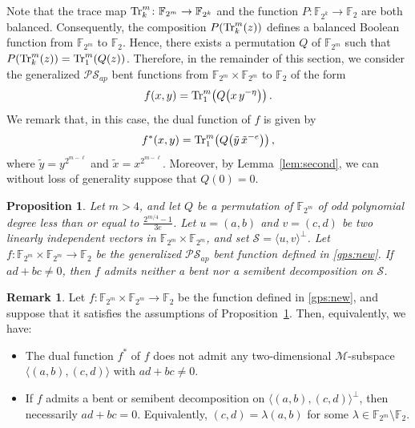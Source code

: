 \documentclass[12pt]{article}
\theoremstyle{plain}
\newtheorem{proposition}[lemma]{Proposition}
\theoremstyle{definition}
\newtheorem{remark}{Remark}
\renewcommand{\to}{\rightarrow}
\newcommand{\Tr}{{\rm Tr}}
\begin{document}
	Note that the trace map
	\(\Tr_k^{m} \colon \mathbb{F}_{2^{m}} \to \mathbb{F}_{2^{k}}\)
	and the function
	\(P \colon \mathbb{F}_{2^{k}} \to \mathbb{F}_2\)
	are both balanced. Consequently, the composition
	\(P\!\left(\Tr_k^{m}(z)\right)\)
	defines a balanced Boolean function from \(\mathbb{F}_{2^{m}}\) to \(\mathbb{F}_2\).
	Hence, there exists a permutation \(Q\) of \(\mathbb{F}_{2^{m}}\) such that $P\!\left(\Tr_k^{m}(z)\right)
	=
	\Tr_1^{m}\!\left(Q(z)\right)$.
	Therefore, in the remainder of this section, we consider the generalized
	\(\mathcal{PS}_{ap}\) bent functions from
	\(\mathbb{F}_{2^{m}} \times \mathbb{F}_{2^{m}}\) to \(\mathbb{F}_2\)
	of the form 
	\begin{align}\label{gps:new}
		f(x,y)
		=
		\Tr_1^{m}\!\left(Q\!\left(x\,y^{-\eta }\right)\right).
	\end{align}
	We remark that, in this case, the dual function of \(f\) is given by
	\begin{align}\label{gps:newdual}
		f^{\ast}(x,y)
		=
		\Tr_1^{m}\!\left(Q\!\left(\tilde y\, \tilde x^{-e}\right)\right),
	\end{align}
	where $\tilde y=y^{2^{m-\ell}}$ and $\tilde x=x^{2^{m-\ell}}$.
	Moreover, by Lemma~\ref{lem:second}, we can without loss of generality suppose that $Q(0)=0$.
	
	
	\begin{proposition}\label{mainprop}
		Let $m > 4$, and let $Q$ be a permutation of $\mathbb{F}_{2^{m}}$ of odd polynomial degree less than or equal to $\frac{2^{m/4}-1}{3e}$. 
		Let $u=(a,b)$ and $v=(c,d)$ be two linearly independent vectors in $\mathbb{F}_{2^{m}} \times \mathbb{F}_{2^{m}}$, and set $\mathcal{S} = \langle u, v \rangle^{\perp}$. 
		Let \(f \colon \mathbb{F}_{2^{m}} \times \mathbb{F}_{2^{m}} \to \mathbb{F}_2\) be the generalized
		\(\mathcal{PS}_{ap}\) bent function defined in \eqref{gps:new}.
		If $ad + bc \neq 0$, then $f$ admits neither a bent nor a semibent decomposition on $\mathcal{S}$.
	\end{proposition}
	
	
	\begin{remark} \label{rem:mainpro}
		Let
		$f\colon \mathbb{F}_{2^{m}} \times \mathbb{F}_{2^{m}} \to \mathbb{F}_2$
		be the function defined in \eqref{gps:new}, and suppose that it satisfies the
		assumptions of Proposition~\ref{mainprop}. Then, equivalently, we have:
		\begin{itemize}
			\item[(i)] The dual function $f^{\ast}$ of $f$ does not admit any
			two-dimensional $\mathcal{M}$-subspace
			$\langle (a,b),(c,d) \rangle$ with $ad+bc \neq 0$.
			
			\item[(ii)] If $f$ admits a bent or semibent decomposition on
			$\langle (a,b),(c,d) \rangle^{\perp}$, then necessarily $ad+bc=0$.
			Equivalently, $(c,d)=\lambda (a,b)$ for some
			$\lambda \in \mathbb{F}_{2^{m}} \setminus \mathbb{F}_{2}$.
		\end{itemize}
	\end{remark}
	
\end{document}
